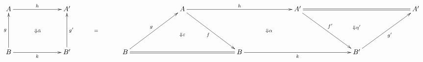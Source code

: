 \documentclass{standalone}
\begin{document}
\pagecolor{bg-color}
\color{fg-color}
\Huge
\(
\xymatrix@R=50pt@C=70pt{
A \ar[r]^-{h} & A' \ar@{}[dr]|-{=} &
 & A \ar[dr]_-{f} \ar[rr]^-{h} \ar@{}[drrr]|-{\Downarrow \alpha} &
& A' \ar[dr]^-{f'} \ar@{=}[rr] \ar@<-20pt>@{}[rr]_-{\Downarrow \eta'} & & A' \\
B \ar[u]^-{g} \ar[r]_-{k} \ar@{}[ur]|-{\Downarrow \bar{\alpha}} & B' \ar[u]_-{g'} &
B \ar[ur]^-{g} \ar@{=}[rr] \ar@<+20pt>@{}[rr]^-{\Downarrow \varepsilon} & &
B \ar[rr]_-{k} & & B' \ar[ur]_-{g'} &
}
\)
\end{document}
